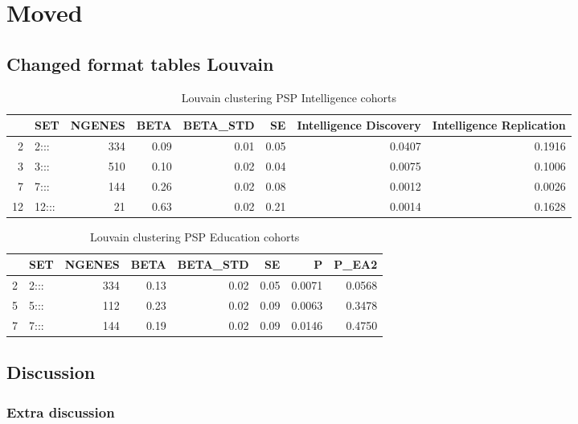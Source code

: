 \section{Moved}
\subsection{Changed format tables Louvain}
\begin{table}[ht]
\centering
\begin{tabular}{rlrrrrrr}
  \hline
 & SET & NGENES & BETA & BETA\_STD & SE & Intelligence Discovery & Intelligence Replication \\ 
  \hline
2 & 2::: & 334 & 0.09 & 0.01 & 0.05 & 0.0407 & 0.1916 \\ 
  3 & 3::: & 510 & 0.10 & 0.02 & 0.04 & 0.0075 & 0.1006 \\ 
  7 & 7::: & 144 & 0.26 & 0.02 & 0.08 & 0.0012 & 0.0026 \\ 
  12 & 12::: & 21 & 0.63 & 0.02 & 0.21 & 0.0014 & 0.1628 \\ 
   \hline
\end{tabular}
\caption{Louvain clustering PSP Intelligence cohorts}
\label{tab:Louvain clustering intelligence}
\end{table}

\begin{table}[ht]
\centering
\begin{tabular}{rlrrrrrr}
  \hline
 & SET & NGENES & BETA & BETA\_STD & SE & P & P\_EA2 \\ 
  \hline
2 & 2::: & 334 & 0.13 & 0.02 & 0.05 & 0.0071 & 0.0568 \\ 
  5 & 5::: & 112 & 0.23 & 0.02 & 0.09 & 0.0063 & 0.3478 \\ 
  7 & 7::: & 144 & 0.19 & 0.02 & 0.09 & 0.0146 & 0.4750 \\ 
   \hline
\end{tabular}
\caption{Louvain clustering PSP Education cohorts}
\label{tab:Louvain clustering education}
\end{table}


\subsection{Discussion}
\subsubsection{Extra discussion}


